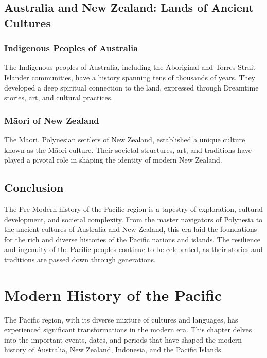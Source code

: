 \documentclass[a4paper,12pt]{book}
\begin{document}
\section{Australia and New Zealand: Lands of Ancient Cultures}
\label{sec:australia-new-zealand}

\subsection{Indigenous Peoples of Australia}
\label{subsec:australia-indigenous-peoples}

The Indigenous peoples of Australia, including the Aboriginal and Torres Strait Islander communities, have a history spanning tens of thousands of years. They developed a deep spiritual connection to the land, expressed through Dreamtime stories, art, and cultural practices.

\subsection{Māori of New Zealand}
\label{subsec:maori-new-zealand}

The Māori, Polynesian settlers of New Zealand, established a unique culture known as the Māori culture. Their societal structures, art, and traditions have played a pivotal role in shaping the identity of modern New Zealand.

\section{Conclusion}
\label{sec:conclusion-pre-modern-pacific}

The Pre-Modern history of the Pacific region is a tapestry of exploration, cultural development, and societal complexity. From the master navigators of Polynesia to the ancient cultures of Australia and New Zealand, this era laid the foundations for the rich and diverse histories of the Pacific nations and islands. The resilience and ingenuity of the Pacific peoples continue to be celebrated, as their stories and traditions are passed down through generations.

\chapter{Modern History of the Pacific}
\label{ch:modern-pacific-history}

The Pacific region, with its diverse mixture of cultures and languages, has experienced significant transformations in the modern era. This chapter delves into the important events, dates, and periods that have shaped the modern history of Australia, New Zealand, Indonesia, and the Pacific Islands.
\end{document}
